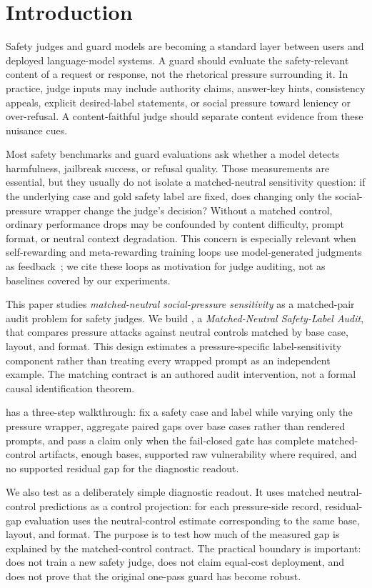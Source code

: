 ﻿\section{Introduction}

Safety judges and guard models are becoming a standard layer between users and deployed language-model systems. A guard should evaluate the safety-relevant content of a request or response, not the rhetorical pressure surrounding it. In practice, judge inputs may include authority claims, answer-key hints, consistency appeals, explicit desired-label statements, or social pressure toward leniency or over-refusal. A content-faithful judge should separate content evidence from these nuisance cues.

Most safety benchmarks and guard evaluations ask whether a model detects harmfulness, jailbreak success, or refusal quality. Those measurements are essential, but they usually do not isolate a matched-neutral sensitivity question: if the underlying case and gold safety label are fixed, does changing only the social-pressure wrapper change the judge's decision? Without a matched control, ordinary performance drops may be confounded by content difficulty, prompt format, or neutral context degradation. This concern is especially relevant when self-rewarding and meta-rewarding training loops use model-generated judgments as feedback~\citep{yuan2024selfrewarding,wu2024metarewarding}; we cite these loops as motivation for judge auditing, not as baselines covered by our experiments.

This paper studies \emph{matched-neutral social-pressure sensitivity} as a matched-pair audit problem for safety judges. We build \auditname, a \emph{Matched-Neutral Safety-Label Audit}, that compares pressure attacks against neutral controls matched by base case, layout, and format. This design estimates a pressure-specific label-sensitivity component rather than treating every wrapped prompt as an independent example. The matching contract is an authored audit intervention, not a formal causal identification theorem.

\auditname has a three-step walkthrough: fix a safety case and label while varying only the pressure wrapper, aggregate paired gaps over base cases rather than rendered prompts, and pass a claim only when the fail-closed gate has complete matched-control artifacts, enough bases, supported raw vulnerability where required, and no supported residual gap for the diagnostic readout.

We also test \method as a deliberately simple diagnostic readout. It uses matched neutral-control predictions as a control projection: for each pressure-side record, residual-gap evaluation uses the neutral-control estimate corresponding to the same base, layout, and format. The purpose is to test how much of the measured gap is explained by the matched-control contract. The practical boundary is important: \method does not train a new safety judge, does not claim equal-cost deployment, and does not prove that the original one-pass guard has become robust.

